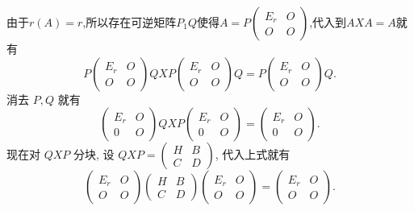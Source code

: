 \documentclass{article}
\begin{document}
 由于$r \left(A\right) = r$,所以存在可逆矩阵$P_1Q$使得$A = P \left(
    \begin{array}{cc}
            E_r & O \\
            O   & O
        \end{array}
    \right)$,代入到$AXA = A$就有
\begin{equation*}
    P\left(\begin{array}{cc}
        E_{r} & O \\
        O     & O
    \end{array}\right) Q X P\left(\begin{array}{cc}
        E_{r} & O \\
        O     & O
    \end{array}\right) Q=P\left(\begin{array}{cc}
        E_{r} & O \\
        O     & O
    \end{array}\right) Q.
\end{equation*}
消去 $P, Q$ 就有
\begin{equation*}
    \left(\begin{array}{cc}
        E_{r} & O \\
        0     & O
    \end{array}\right) Q X P\left(\begin{array}{cc}
        E_{r} & O \\
        0     & O
    \end{array}\right)=\left(\begin{array}{cc}
        E_{r} & O \\
        0     & O
    \end{array}\right).
\end{equation*}
现在对 $Q X P$ 分块, 设 $Q X P=\left(\begin{array}{cc}H & B \\ C & D\end{array}\right)$, 代入上式就有
\begin{equation*}
    \left(\begin{array}{cc}
        E_{r} & O \\
        O     & O
    \end{array}\right)\left(\begin{array}{cc}
        H & B \\
        C & D
    \end{array}\right)\left(\begin{array}{cc}
        E_{r} & O \\
        O     & O
    \end{array}\right)=\left(\begin{array}{cc}
        E_{r} & O \\
        O     & O
    \end{array}\right).
\end{equation*}
\end{document}
